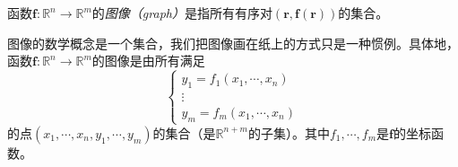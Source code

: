 \documentclass[main.tex]{subfiles}
\begin{document}
\begin{definition}[函数的图像]\label{def:II.4.3}
    函数$\mathbf{f}:\mathbb{R}^n\rightarrow\mathbb{R}^m$的\emph{图像（graph）}是指所有有序对$\left(\mathbf{r},\mathbf{f}\left(\mathbf{r}\right)\right)$的集合\cite[\S 6.4$\sim$6.7]{华工高数2009上}。
\end{definition}

图像的数学概念是一个集合，我们把图像画在纸上的方式只是一种惯例。具体地，函数$\mathbf{f}:\mathbb{R}^n\rightarrow\mathbb{R}^m$的图像是由所有满足
\[
    \left\{\begin{array}{c}y_1=f_1\left(x_1,\cdots,x_n\right)\\\vdots\\y_m=f_m\left(x_1,\cdots,x_n\right)\end{array}\right.
\]
的点$\left(x_1,\cdots,x_n,y_1,\cdots,y_m\right)$的集合（是$\mathbb{R}^{n+m}$的子集）。其中$f_1,\cdots,f_m$是$\mathbf{f}$的坐标函数。
\end{document}

